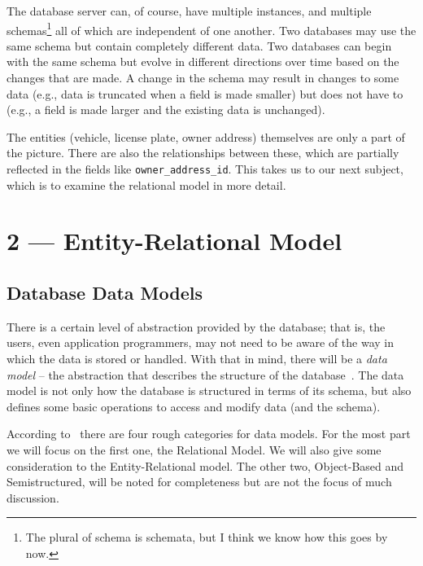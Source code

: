 \documentclass[a4paper]{report}
\begin{document}
The database server can, of course, have multiple instances, and multiple schemas\footnote{The plural of schema is schemata, but I think we know how this goes by now.} all of which are independent of one another. Two databases may use the same schema but contain completely different data. Two databases can begin with the same schema but evolve in different directions over time based on the changes that are made. A change in the schema may result in changes to some data (e.g., data is truncated when a field is made smaller) but does not have to (e.g., a field is made larger and the existing data is unchanged).

The entities (vehicle, license plate, owner address) themselves are only a part of the picture. There are also the relationships between these, which are partially reflected in the fields like \texttt{owner\_address\_id}. This takes us to our next subject, which is to examine the relational model in more detail.











\chapter*{2 --- Entity-Relational Model}


\section*{Database Data Models} 
There is a certain level of abstraction provided by the database; that is, the users, even application programmers, may not need to be aware of the way in which the data is stored or handled. With that in mind, there will be a \textit{data model} -- the abstraction that describes the structure of the database~\cite{fds}. The data model is not only how the database is structured in terms of its schema, but also defines some basic operations to access and modify data (and the schema). 

According to~\cite{dsc} there are four rough categories for data models. For the most part we will focus on the first one, the Relational Model. We will also give some consideration to the Entity-Relational model. The other two, Object-Based and Semistructured, will be noted for completeness but are not the focus of much discussion.
\end{document}
